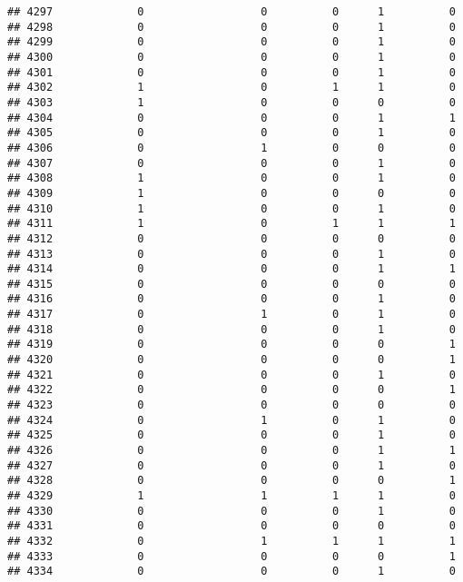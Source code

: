 \documentclass[
]{article}
\begin{document}
\begin{verbatim}
## 4297             0                  0          0      1          0
## 4298             0                  0          0      1          0
## 4299             0                  0          0      1          0
## 4300             0                  0          0      1          0
## 4301             0                  0          0      1          0
## 4302             1                  0          1      1          0
## 4303             1                  0          0      0          0
## 4304             0                  0          0      1          1
## 4305             0                  0          0      1          0
## 4306             0                  1          0      0          0
## 4307             0                  0          0      1          0
## 4308             1                  0          0      1          0
## 4309             1                  0          0      0          0
## 4310             1                  0          0      1          0
## 4311             1                  0          1      1          1
## 4312             0                  0          0      0          0
## 4313             0                  0          0      1          0
## 4314             0                  0          0      1          1
## 4315             0                  0          0      0          0
## 4316             0                  0          0      1          0
## 4317             0                  1          0      1          0
## 4318             0                  0          0      1          0
## 4319             0                  0          0      0          1
## 4320             0                  0          0      0          1
## 4321             0                  0          0      1          0
## 4322             0                  0          0      0          1
## 4323             0                  0          0      0          0
## 4324             0                  1          0      1          0
## 4325             0                  0          0      1          0
## 4326             0                  0          0      1          1
## 4327             0                  0          0      1          0
## 4328             0                  0          0      0          1
## 4329             1                  1          1      1          0
## 4330             0                  0          0      1          0
## 4331             0                  0          0      0          0
## 4332             0                  1          1      1          1
## 4333             0                  0          0      0          1
## 4334             0                  0          0      1          0

\end{verbatim}
\end{document}
